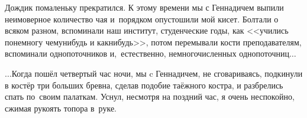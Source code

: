 Дождик помаленьку прекратился. К этому времени мы с Геннадичем выпили неимоверное количество чая и~порядком опустошили мой кисет. Болтали о всяком разном, вспоминали наш институт, студенческие годы, как <<учились понемногу чему\sdash нибудь и как\sdash нибудь>>, потом перемывали кости преподавателям, вспоминали однопоточников и,~естественно, немногочисленных однопоточниц$\ldots$







$\ldots$Когда пошёл четвертый час ночи, мы c Геннадичем, не сговариваясь, подкинули в костёр три больших бревна, сделав подобие таёжного костра, и разбрелись спать по~своим палаткам. Уснул, несмотря на поздний час, я очень неспокойно, сжимая рукоять топора в~руке. 

\begin{center}
\end{center}
